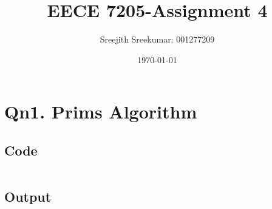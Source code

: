 \documentclass{article}
\title{EECE 7205-Assignment 4}
\author{Sreejith Sreekumar: 001277209}
\date{\today}
\begin{document}
\maketitle
\section{Qn1. Prims Algorithm}

\subsection{Code}
\begin{verbatim}
\end{verbatim}

\subsection{Output}

\begin{verbatim}
\end{verbatim}  
\end{document}

